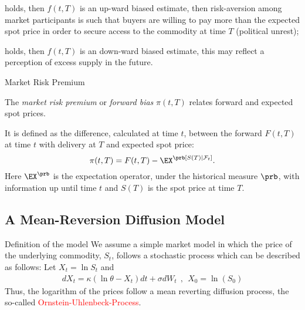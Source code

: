 {%



	holds, then $f(t,T)$ is an up-ward biased estimate, then risk-aversion
among market participants is such that buyers are willing to pay more than the expected
spot price in order to secure access to the commodity at time $T$ (political unrest);

	holds, then $f(t,T)$ is an down-ward biased estimate, this may reflect a
perception of excess supply in the future.






{Market Risk Premium}






	The \emph{market risk premium} or \emph{forward bias} $\pi (t,T)$
relates forward and expected spot prices.

	It is defined as the difference, calculated at time $t$, between
the forward $F(t,T)$ at time $t$ with delivery at $T$ and expected
spot price:
\begin{equation}\label{forward risk premium}
\pi(t,T)= F(t,T)-\EX^\prb[S(T)|\mathcal F_t].
\end{equation}
Here $\EX^\prb$ is the expectation operator, under the
historical measure $\prb$, with information up until time $t$ and
$S(T)$ is the spot price at time $T$.






\subsection[Mean-Reversion Model]{A Mean-Reversion Diffusion Model}

{Definition of the model}
We assume a simple market model in which the price of the underlying commodity, $S_t$, follows a stochastic process which can be described as follows:
Let $X_t = \ln S_t$ and
\begin{align*}
	dX_t = \kappa (\ln \theta - X_t)dt + \sigma dW_t~~,~~X_0 = \ln(S_0)
\end{align*}
Thus, the logarithm of the prices follow a mean reverting diffusion process, the so-called \textcolor{red}{Ornstein-Uhlenbeck-Process}.\\



}
